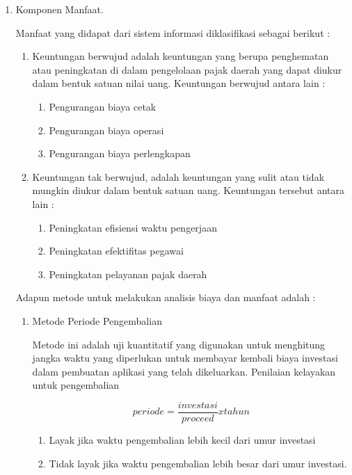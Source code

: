 \documentclass[pdftex,12pt, oneside]{article}
\begin{document}
\begin{enumerate}
\begin{enumerate}
	\item Komponen Manfaat.
	
Manfaat yang didapat dari sistem informasi diklasifikasi sebagai berikut :

\begin{enumerate}
	\item Keuntungan berwujud adalah keuntungan yang berupa penghematan atau peningkatan di dalam pengelolaan pajak daerah yang dapat diukur dalam bentuk satuan nilai uang. Keuntungan berwujud antara lain :
	
	\begin{enumerate}
		\item Pengurangan biaya cetak
		\item Pengurangan biaya operasi
		\item Pengurangan biaya perlengkapan
	\end{enumerate}
	
	\item Keuntungan tak berwujud, adalah keuntungan yang sulit atau tidak mungkin diukur dalam bentuk satuan uang. Keuntungan tersebut antara lain :
	
	\begin{enumerate}
		\item Peningkatan efisiensi waktu pengerjaan
		\item Peningkatan efektifitas pegawai
		\item Peningkatan pelayanan pajak daerah
	\end{enumerate}
\end{enumerate}	

Adapun metode untuk melakukan analisis biaya dan manfaat adalah :

\begin{enumerate}
	\item Metode Periode Pengembalian

Metode ini adalah uji kuantitatif yang digunakan untuk menghitung jangka waktu yang diperlukan untuk membayar kembali biaya investasi dalam pembuatan aplikasi yang telah dikeluarkan. Penilaian kelayakan untuk pengembalian 

\[periode = \frac{investasi}{proceed} x tahun \]

\begin{enumerate}
	\item Layak jika waktu pengembalian lebih kecil dari umur investasi
	\item Tidak layak jika waktu pengembalian lebih besar dari umur investasi.
\end{enumerate}


\end{enumerate}
\end{enumerate}
\end{enumerate}
\end{document}
